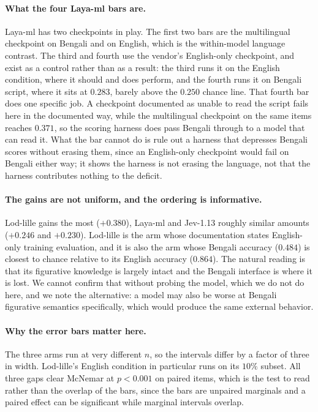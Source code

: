 \documentclass[11pt]{article}
\begin{document}
\paragraph{What the four Laya-ml bars are.} Laya-ml has two checkpoints in play.
The first two bars are the multilingual checkpoint on Bengali and on English, which
is the within-model language contrast. The third and fourth use the vendor's
English-only checkpoint, and exist as a control rather than as a result: the third
runs it on the English condition, where it should and does perform, and the fourth
runs it on Bengali script, where it sits at $0.283$, barely above the $0.250$
chance line. That fourth bar does one specific job. A checkpoint documented as
unable to read the script fails here in the documented way, while the multilingual
checkpoint on the same items reaches $0.371$, so the scoring harness does pass
Bengali through to a model that can read it. What the bar cannot do is rule out a
harness that depresses Bengali scores without erasing them, since an English-only
checkpoint would fail on Bengali either way; it shows the harness is not erasing
the language, not that the harness contributes nothing to the deficit.

\paragraph{The gains are not uniform, and the ordering is informative.} Lod-lille
gains the most ($+0.380$), Laya-ml and Jev-1.13 roughly similar amounts ($+0.246$
and $+0.230$). Lod-lille is the arm whose documentation states English-only
training evaluation, and it is also the arm whose Bengali accuracy ($0.484$) is
closest to chance relative to its English accuracy ($0.864$). The natural reading
is that its figurative knowledge is largely intact and the Bengali interface is
where it is lost. We cannot confirm that without probing the model, which we do
not do here, and we note the alternative: a model may also be worse at Bengali
figurative semantics specifically, which would produce the same external
behavior.

\paragraph{Why the error bars matter here.} The three arms run at very different
$n$, so the intervals differ by a factor of three in width. Lod-lille's English
condition in particular runs on its $10\%$ subset. All three gaps clear McNemar at
$p<0.001$ on paired items, which is the test to read rather than the overlap of
the bars, since the bars are unpaired marginals and a paired effect can be
significant while marginal intervals overlap.
\end{document}

